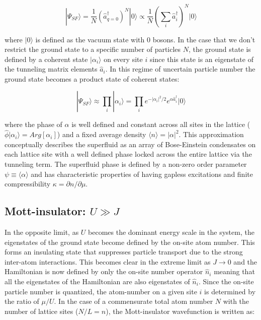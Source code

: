 \begin{equation}
\label{eqn:SF}
| \Psi_{SF} \rangle = \frac{1}{N} \left ( \hat{a}^\dagger_{q=0} \right )^N |0\rangle \propto \frac{1}{N} \left (\sum_i \hat{a}^\dagger_i \right )^N |0\rangle
\end{equation} 

where $|0\rangle$ is defined as the vacuum state with 0 bosons. In the case that we don't restrict the ground state to a specific number of particles $N$, the ground state is defined by a coherent state $|\alpha_i\rangle$ on every site $i$ since this state is an eigenstate of the tunneling matrix elements $\hat{a}_i$. In this regime of uncertain particle number the ground state becomes a product state of coherent states:

\begin{equation}
\label{eqn:SFcoh}
|\Psi_{SF} \rangle \approx \prod_i |\alpha_i\rangle = \prod_i e^{- |\alpha_i |^2 /2} e^{\alpha \hat{a}^\dagger_i} |0\rangle
\end{equation}

where the phase of $\alpha$ is well defined and constant across all sites in the lattice ($\hat{\phi} |\alpha_i\rangle = Arg[\alpha_i]$) and a fixed average density $\langle n \rangle = | \alpha |^2 $. This approximation conceptually describes the superfluid as an array of Bose-Einstein condensates on each lattice site with a well defined phase locked across the entire lattice via the tunneling term. The superfluid phase is defined by a non-zero order parameter $\psi \equiv \langle \alpha \rangle$ and has characteristic properties of having gapless excitations and finite compressibility $\kappa = \partial n/\partial \mu$.

\subsection{Mott-insulator: $U \gg J$}

In the opposite limit, as $U$ becomes the dominant energy scale in the system, the eigenstates of the ground state become defined by the on-site atom number. This forms an insulating state that suppresses particle transport due to the strong inter-atom interactions. This becomes clear in the extreme limit as $J\rightarrow 0$ and the Hamiltonian is now defined by only the on-site number operator $\hat{n}_i$ meaning that all the eigenstates of the Hamiltonian are also eigenstates of $\hat{n}_i$.  Since the on-site particle number is quantized, the atom-number on a given site $i$ is determined by the ratio of $\mu/U$. In the case of a commensurate total atom number $N$ with the number of lattice sites ($N/L=n$), the Mott-insulator wavefunction is written as:

